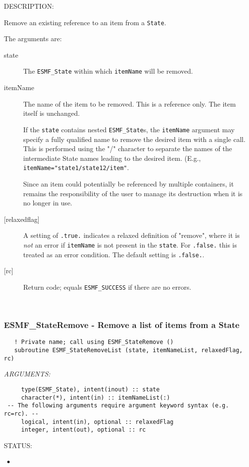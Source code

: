 {\sf DESCRIPTION:\\ }


   Remove an existing reference to an item from a {\tt State}.
  
   The arguments are:
   \begin{description}
   \item[state]
   The {\tt ESMF\_State} within which {\tt itemName} will be removed.
   \item[itemName]
   The name of the item to be removed. This is a reference only.
   The item itself is unchanged.
  
   If the {\tt state} contains nested {\tt ESMF\_State}s,
   the {\tt itemName} argument may specify a fully qualified name
   to remove the desired item with a single call. This is performed
   using the "/" character to separate the names of the intermediate
   State names leading to the desired item. (E.g.,
   {\tt itemName="state1/state12/item"}.
  
   Since an item could potentially be referenced by multiple containers,
   it remains the responsibility of the user to manage its
   destruction when it is no longer in use.
   \item[{[relaxedflag]}]
   A setting of {\tt .true.} indicates a relaxed definition of "remove",
   where it is {\em not} an error if {\tt itemName} is not present in the
   {\tt state}. For {\tt .false.} this is treated
   as an error condition. The default setting is {\tt .false.}.
   \item[{[rc]}]
   Return code; equals {\tt ESMF\_SUCCESS} if there are no errors.
   \end{description} 
 
\mbox{}\hrulefill\ 
 
\subsubsection [ESMF\_StateRemove] {ESMF\_StateRemove - Remove a list of items from a State}


   \label{esmfstateremovelist}
  
\begin{verbatim}   ! Private name; call using ESMF_StateRemove ()
   subroutine ESMF_StateRemoveList (state, itemNameList, relaxedFlag, rc)\end{verbatim}{\em ARGUMENTS:}
\begin{verbatim}     type(ESMF_State), intent(inout) :: state
     character(*), intent(in) :: itemNameList(:)
 -- The following arguments require argument keyword syntax (e.g. rc=rc). --
     logical, intent(in), optional :: relaxedFlag
     integer, intent(out), optional :: rc\end{verbatim}
{\sf STATUS:}
   \begin{itemize}
   \item{}
   \end{itemize}
  
